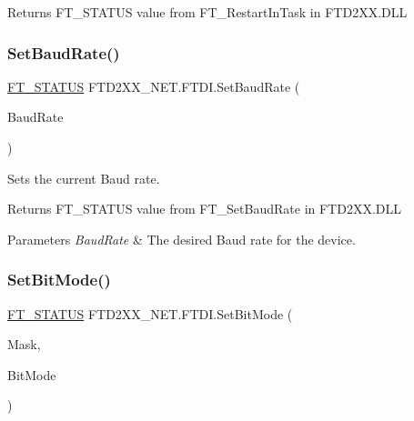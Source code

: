 \begin{DoxyReturn}{Returns}
F\+T\+\_\+\+S\+T\+A\+T\+US value from F\+T\+\_\+\+Restart\+In\+Task in F\+T\+D2\+X\+X.\+D\+LL
\end{DoxyReturn}
\mbox{\label{class_f_t_d2_x_x___n_e_t_1_1_f_t_d_i_a8e67f80eaaa6a0904af25d2d8b312fbc}} 
\subsubsection{\texorpdfstring{SetBaudRate()}{SetBaudRate()}}
{\footnotesize\ttfamily \mbox{\hyperlink{class_f_t_d2_x_x___n_e_t_1_1_f_t_d_i_aabe20ad905cc4ccc1e35dd5b877d9a83}{F\+T\+\_\+\+S\+T\+A\+T\+US}} F\+T\+D2\+X\+X\+\_\+\+N\+E\+T.\+F\+T\+D\+I.\+Set\+Baud\+Rate (\begin{DoxyParamCaption}\item[{U\+Int32}]{Baud\+Rate }\end{DoxyParamCaption})}



Sets the current Baud rate. 

\begin{DoxyReturn}{Returns}
F\+T\+\_\+\+S\+T\+A\+T\+US value from F\+T\+\_\+\+Set\+Baud\+Rate in F\+T\+D2\+X\+X.\+D\+LL
\end{DoxyReturn}

\begin{DoxyParams}{Parameters}
{\em Baud\+Rate} & The desired Baud rate for the device.\\
\hline
\end{DoxyParams}
\mbox{\label{class_f_t_d2_x_x___n_e_t_1_1_f_t_d_i_a7cca88354e77e1bc0967a13192824e1e}} 
\subsubsection{\texorpdfstring{SetBitMode()}{SetBitMode()}}
{\footnotesize\ttfamily \mbox{\hyperlink{class_f_t_d2_x_x___n_e_t_1_1_f_t_d_i_aabe20ad905cc4ccc1e35dd5b877d9a83}{F\+T\+\_\+\+S\+T\+A\+T\+US}} F\+T\+D2\+X\+X\+\_\+\+N\+E\+T.\+F\+T\+D\+I.\+Set\+Bit\+Mode (\begin{DoxyParamCaption}\item[{byte}]{Mask,  }\item[{byte}]{Bit\+Mode }\end{DoxyParamCaption})}



